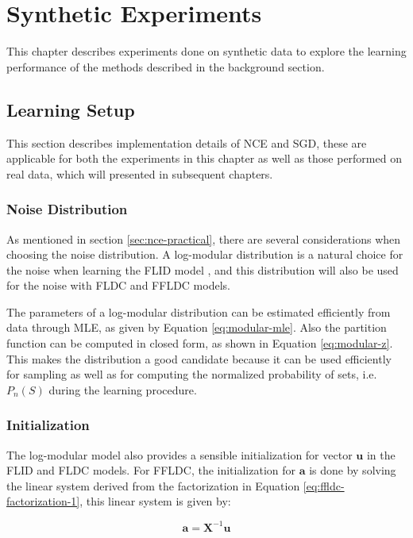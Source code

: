 \chapter{Synthetic Experiments}
\label{sec:synthetic}

This chapter describes experiments done on synthetic data to explore the learning performance of the methods described in the background section.

\section{Learning Setup}

This section describes implementation details of NCE and SGD, these are applicable for both the experiments in this chapter as well as those performed on real data, which will presented in subsequent chapters.

\subsection{Noise Distribution}

As mentioned in section \ref{sec:nce-practical}, there are several considerations when choosing the noise distribution. A log-modular distribution is a natural choice for the noise when learning the FLID model \citep{tschiatschek16learning}, and this distribution will also be used for the noise with FLDC and FFLDC models.

The parameters of a log-modular distribution can be estimated efficiently from data through MLE, as given by Equation \eqref{eq:modular-mle}. Also the partition function can be computed in closed form, as shown in Equation \eqref{eq:modular-z}. This makes the distribution a good candidate because it can be used efficiently for sampling as well as for computing the normalized probability of sets, i.e. $P_{n}(S)$ during the learning procedure.

\subsection{Initialization}

The log-modular model also provides a sensible initialization for vector $\mathbf{u}$ in the FLID and FLDC models. For FFLDC, the initialization for $\mathbf{a}$ is done by solving the linear system derived from the factorization in Equation \eqref{eq:ffldc-factorization-1}, this linear system is given by:

\begin{equation}
  \label{eq:modular_features}
  \mathbf{a} = \mathbf{X}^{-1}\mathbf{u}
\end{equation}

